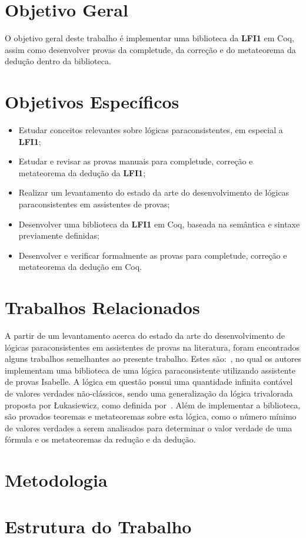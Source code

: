     \section{Objetivo Geral}
    O objetivo geral deste trabalho é implementar uma biblioteca da \textbf{LFI1} em Coq, assim como desenvolver provas da completude, da correção e do metateorema da dedução dentro da biblioteca.


    \section{Objetivos Específicos}
    \begin{itemize}
        \item Estudar conceitos relevantes sobre lógicas paraconsistentes, em especial a \textbf{LFI1};
        \item Estudar e revisar as provas manuais para completude, correção e metateorema da dedução da \textbf{LFI1};
        \item Realizar um levantamento do estado da arte do desenvolvimento de lógicas paraconsistentes em assistentes de provas;
        \item Desenvolver uma biblioteca da \textbf{LFI1} em Coq, baseada na semântica e sintaxe previamente definidas;
        \item Desenvolver e verificar formalmente as provas para completude, correção e metateorema da dedução em Coq.
    \end{itemize}


    \section{Trabalhos Relacionados}
    A partir de um levantamento acerca do estado da arte do desenvolvimento de lógicas paraconsistentes em assistentes de provas na literatura, foram encontrados alguns trabalhos semelhantes ao presente trabalho. Estes são:~, no qual os autores implementam uma biblioteca de uma lógica paraconsistente utilizando assistente de provas Isabelle. A lógica em questão possui uma quantidade infinita contável de valores verdades não-clássicos, sendo uma generalização da lógica trivalorada proposta por {\L}ukasiewicz, como definida por~. Além de implementar a biblioteca, são provados teoremas e metateoremas sobre esta lógica, como o número mínimo de valores verdades a serem analisados para determinar o valor verdade de uma fórmula e os metateoremas da redução e da dedução.


    \section{Metodologia}
        

    \section{Estrutura do Trabalho}
       